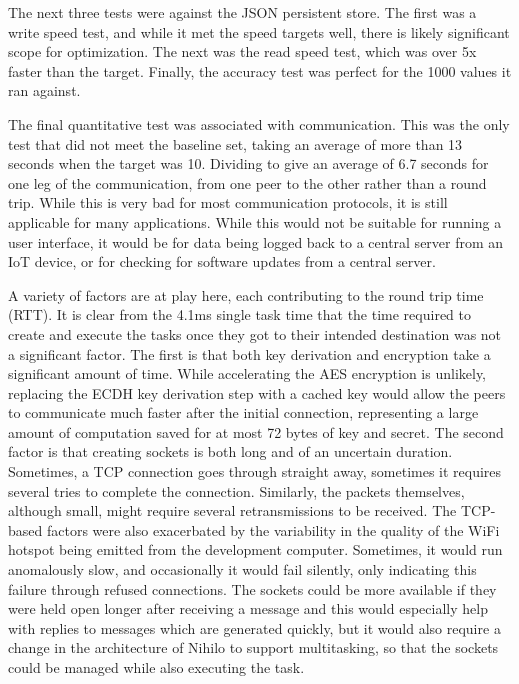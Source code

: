 \documentclass{article}
\begin{document}
The next three tests were against the JSON persistent store. The first was a write speed test, and while it met the speed targets well, there is likely significant scope for optimization. The next was the read speed test, which was over 5x faster than the target. Finally, the accuracy test was perfect for the 1000 values it ran against.

The final quantitative test was associated with communication. This was the only test that did not meet the baseline set, taking an average of more than 13 seconds when the target was 10. Dividing to give an average of 6.7 seconds for one leg of the communication, from one peer to the other rather than a round trip. While this is very bad for most communication protocols, it is still applicable for many applications. While this would not be suitable for running a user interface, it would be for data being logged back to a central server from an IoT device, or for checking for software updates from a central server. 

A variety of factors are at play here, each contributing to the round trip time (RTT). It is clear from the 4.1ms single task time that the time required to create and execute the tasks once they got to their intended destination was not a significant factor. The first is that both key derivation and encryption take a significant amount of time. While accelerating the AES encryption is unlikely, replacing the ECDH key derivation step with a cached key would allow the peers to communicate much faster after the initial connection, representing a large amount of computation saved for at most 72 bytes of key and secret. The second factor is that creating sockets is both long and of an uncertain duration. Sometimes, a TCP connection goes through straight away, sometimes it requires several tries to complete the connection. Similarly, the packets themselves, although small, might require several retransmissions to be received. The TCP-based factors were also exacerbated by the variability in the quality of the WiFi hotspot being emitted from the development computer. Sometimes, it would run anomalously slow, and occasionally it would fail silently, only indicating this failure through refused connections. The sockets could be more available if they were held open longer after receiving a message and this would especially help with replies to messages which are generated quickly, but it would also require a change in the architecture of Nihilo to support multitasking, so that the sockets could be managed while also executing the task.
\end{document}
